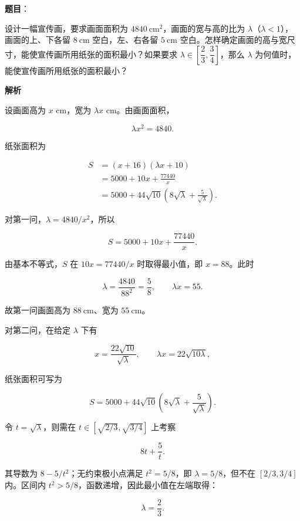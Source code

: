 \begin{answer}

\textbf{题目}：

设计一幅宣传画，要求画面面积为 $4840\ \mathrm{cm}^2$，画面的宽与高的比为 $\lambda$（$\lambda<1$），画面的上、下各留 $8\ \mathrm{cm}$ 空白，左、右各留 $5\ \mathrm{cm}$ 空白。怎样确定画面的高与宽尺寸，能使宣传画所用纸张的面积最小？如果要求 $\lambda\in\left[\dfrac23,\dfrac34\right]$，那么 $\lambda$ 为何值时，能使宣传画所用纸张的面积最小？

\textbf{解析}

设画面高为 $x$ cm，宽为 $\lambda x$ cm。由画面面积，

\nopagebreak[4]
\[
\lambda x^2=4840.
\]

纸张面积为

\nopagebreak[4]
\[
\begin{aligned}
S
&=(x+16)(\lambda x+10)\\
&=5000+10x+\frac{77440}{x}\\
&=5000+44\sqrt{10}\left(8\sqrt\lambda+\frac5{\sqrt\lambda}\right).
\end{aligned}
\]

对第一问，$\lambda=4840/x^2$，所以

\nopagebreak[4]
\[
S=5000+10x+\frac{77440}{x}.
\]

由基本不等式，$S$ 在 $10x=77440/x$ 时取得最小值，即 $x=88$。此时

\nopagebreak[4]
\[
\lambda=\frac{4840}{88^2}=\frac58,\qquad
\lambda x=55.
\]

故第一问画面高为 $88\ \mathrm{cm}$、宽为 $55\ \mathrm{cm}$。

对第二问，在给定 $\lambda$ 下有

\nopagebreak[4]
\[
x=\frac{22\sqrt{10}}{\sqrt\lambda},
\qquad
\lambda x=22\sqrt{10\lambda},
\]

纸张面积可写为

\nopagebreak[4]
\[
S=5000+44\sqrt{10}\left(8\sqrt\lambda+\frac5{\sqrt\lambda}\right).
\]

令 $t=\sqrt\lambda$，则需在 $t\in[\sqrt{2/3},\sqrt{3/4}]$ 上考察

\nopagebreak[4]
\[
8t+\frac5t.
\]

其导数为 $8-5/t^2$；无约束极小点满足 $t^2=5/8$，即 $\lambda=5/8$，但不在 $\left[2/3,3/4\right]$ 内。区间内 $t^2>5/8$，函数递增，因此最小值在左端取得：

\nopagebreak[4]
\[
\lambda=\frac23.
\]


\end{answer}
